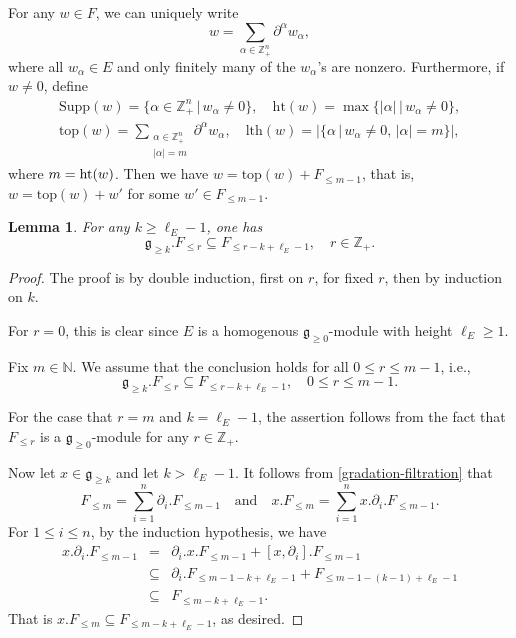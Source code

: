 \documentclass[12pt, a4paper]{amsart}
\newcommand{\fg}{\mathfrak g}
\newcommand{\N}{\mathbb N}
\newcommand{\Z}{\mathbb Z}
\theoremstyle{Theorem}
\theoremstyle{Theorem}
\newtheorem{lemma}[thm]{Lemma}
\numberwithin{equation}{section}
\begin{document}
For any $w\in F$, we can uniquely write
\[w=\sum_{\alpha\in\Z_{+}^{n}}\partial^{\alpha}w_{\alpha},\]
where all $w_{\alpha}\in E$ and only finitely many of the $w_{\alpha}$'s are nonzero. Furthermore, if $w\neq0$, define
\begin{equation*}
	\begin{split}
		\mathrm{Supp}(w)=\Big\{\alpha\in{\mathbb{Z}^n_+}\,\big|\, w_{\alpha}\neq0\Big\},
\quad \mathrm{ht}(w)=\max\Big\{|\alpha|\,\big| \,w_{\alpha}\neq0\Big\},\\
		\mathrm{top}(w)=\sum_{\substack{\alpha\in{{\mathbb{Z}^n_+}}\\|\alpha|=m}}\partial^{\alpha}w_{\alpha},\quad \mathrm{lth}(w)=\Big|\big\{\alpha\,\big|\,w_{\alpha}\neq0,\,|\alpha|=m\big\}\Big|,
	\end{split}
\end{equation*}
where $m={\rm ht}(w)$.
Then we have $w=\mathrm{top}(w)+F_{\leq m-1}$, that is, $w=\mathrm{top}(w)+w'$ for some $w'\in F_{\leq m-1}$.



\begin{lemma}\label{NOT-submodule}
For any $k\geq \ell_{E}-1$, one has \[\fg_{\geq k}.F_{\leq r}\subseteq
F_{\leq r-k+\ell_{E}-1},\quad r\in\Z_{+}.\]
\end{lemma}

\begin{proof}
The proof is by double induction, first  on $r$,  for fixed $r$, then by induction on $k$.

For $r=0$, this is clear since $E$ is a homogenous $\fg_{\geq0}$-module with height $\ell_{E}\geq1$.

Fix $m\in\N$. We assume that the conclusion holds for all $0\leq r\leq m-1$, i.e., \[\fg_{\geq k}.F_{\leq r}\subseteq
F_{\leq r-k+\ell_{E}-1},\quad 0\leq r\leq m-1.\]

For the case that $r=m$ and $k=\ell_{E}-1$, the assertion follows from the fact that $F_{\leq r}$ is a $\fg_{\geq0}$-module for any $r\in\Z_{+}$.


Now let $x\in \fg_{\geq k}$ and let $k>\ell_{E}-1$. It follows from \eqref{gradation-filtration} that
\[F_{\leq m}=\sum_{i=1}^{n}\partial_{i}.F_{\leq m-1}\quad \text{and}
\quad x.F_{\leq m}=\sum_{i=1}^{n}x.\partial_{i}.F_{\leq m-1}.\]
For $1\leq i\leq n$, by the induction hypothesis, we have
\begin{eqnarray*}
x.\partial_{i}.F_{\leq m-1}&=&\partial_{i}.x.F_{\leq m-1}+[x,\partial_{i}].F_{\leq m-1}\\
&\subseteq&\partial_{i}.F_{\leq m-1-k+\ell_{E}-1}+F_{\leq m-1-(k-1)+\ell_{E}-1}\\
&\subseteq&F_{\leq m-k+\ell_{E}-1}.
\end{eqnarray*}
That is $x.F_{\leq m}\subseteq F_{\leq m-k+\ell_{E}-1}$, as desired.
\end{proof}
\end{document}
